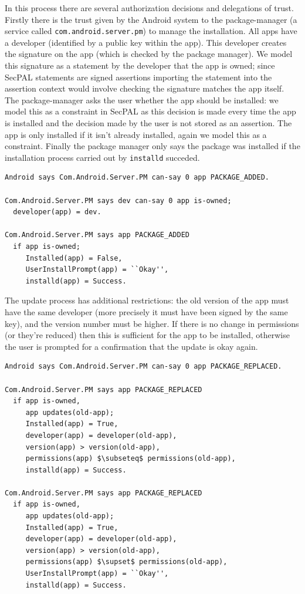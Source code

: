 \documentclass[a4paper]{article}
\begin{document}
In this process there are several authorization decisions and delegations of
trust.  Firstly there is the trust given by the Android system to the
package-manager (a service called \texttt{com.android.server.pm}) to manage the
installation.  All apps have a developer (identified by a public key within the
app).  This developer creates the signature on the app (which is checked by the
package manager).  We model this signature as a statement by the developer that
the app is owned; since SecPAL statements are signed assertions importing the
statement into the assertion context would involve checking the signature
matches the app itself.  The package-manager asks the user whether the app
should be installed: we model this as a constraint in SecPAL as this decision is
made every time the app is installed and the decision made by the user is not
stored as an assertion.  The app is only installed if it isn't already
installed, again we model this as a constraint.  Finally the package manager
only says the package was installed if the installation process carried out by
\texttt{installd} succeded. 

\begin{lstlisting}[language=SecPAL]
Android says Com.Android.Server.PM can-say 0 app PACKAGE_ADDED.

Com.Android.Server.PM says dev can-say 0 app is-owned;
  developer(app) = dev.

Com.Android.Server.PM says app PACKAGE_ADDED
  if app is-owned;
     Installed(app) = False,
     UserInstallPrompt(app) = ``Okay'',
     installd(app) = Success.
\end{lstlisting}
    
The update process has additional restrictions: the old version of the app must
have the same developer (more precisely it must have been signed by the same
key), and the version number must be higher.  If there is no change in
permissions (or they're reduced) then this is sufficient for the app to be
installed, otherwise the user is prompted for a confirmation that the update is
okay again.

\begin{lstlisting}[language=SecPAL]
Android says Com.Android.Server.PM can-say 0 app PACKAGE_REPLACED.

Com.Android.Server.PM says app PACKAGE_REPLACED
  if app is-owned,
     app updates(old-app);
     Installed(app) = True,
     developer(app) = developer(old-app),
     version(app) > version(old-app),
     permissions(app) $\subseteq$ permissions(old-app),
     installd(app) = Success.

Com.Android.Server.PM says app PACKAGE_REPLACED
  if app is-owned,
     app updates(old-app);
     Installed(app) = True,
     developer(app) = developer(old-app),
     version(app) > version(old-app),
     permissions(app) $\supset$ permissions(old-app),
     UserInstallPrompt(app) = ``Okay'',
     installd(app) = Success.
\end{lstlisting}
\end{document}
